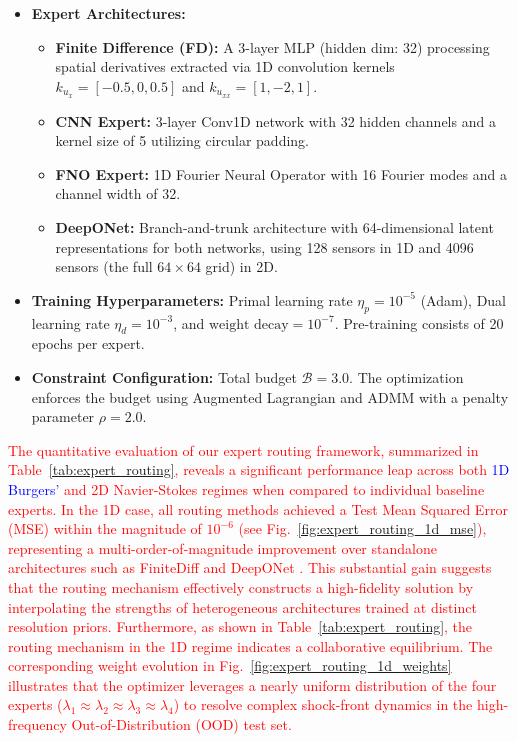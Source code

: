 \documentclass[preprint,12pt,authoryear]{elsarticle}
\begin{document}
\begin{itemize}
    \item \textbf{Expert Architectures:}
    \begin{itemize}
        \item \textbf{Finite Difference (FD):} A 3-layer MLP (hidden dim: 32) processing spatial derivatives extracted via 1D convolution kernels $k_{u_x} = [-0.5, 0, 0.5]$ and $k_{u_{xx}} = [1, -2, 1]$.
        \item \textbf{CNN Expert:} 3-layer Conv1D network with 32 hidden channels and a kernel size of 5 utilizing circular padding.
        \item \textbf{FNO Expert:} 1D Fourier Neural Operator with 16 Fourier modes and a channel width of 32.
        \item \textbf{DeepONet:} Branch-and-trunk architecture with 64-dimensional latent representations for both networks, using 128 sensors in 1D and 4096 sensors (the full $64\times64$ grid) in 2D.
    \end{itemize}
    \item \textbf{Training Hyperparameters:} Primal learning rate $\eta_p = 10^{-5}$ (Adam), Dual learning rate $\eta_d = 10^{-3}$, and $\text{weight decay} = 10^{-7}$. Pre-training consists of 20 epochs per expert.
    \item \textbf{Constraint Configuration:} Total budget $\mathcal{B} = 3.0$. The optimization enforces the budget using Augmented Lagrangian and ADMM with a penalty parameter $\rho = 2.0$.
\end{itemize}


\textcolor{red}{The quantitative evaluation of our expert routing framework, summarized in Table~\ref{tab:expert_routing}, reveals a significant performance leap across both \textcolor{blue}{1D Burgers'} and 2D Navier-Stokes regimes when compared to individual baseline experts. In the 1D case, all routing methods achieved a Test Mean Squared Error (MSE) within the magnitude of $10^{-6}$ (see Fig.~\ref{fig:expert_routing_1d_mse}), representing a multi-order-of-magnitude improvement over standalone architectures such as FiniteDiff and DeepONet . This substantial gain suggests that the routing mechanism effectively constructs a high-fidelity solution by interpolating the strengths of heterogeneous architectures trained at distinct resolution priors. Furthermore, as shown in Table~\ref{tab:expert_routing}, the routing mechanism in the 1D regime indicates a collaborative equilibrium. The corresponding weight evolution in Fig.~\ref{fig:expert_routing_1d_weights} illustrates that the optimizer leverages a nearly uniform distribution of the four experts ($\lambda_1 \approx \lambda_2 \approx \lambda_3 \approx \lambda_4$) to resolve complex shock-front dynamics in the high-frequency Out-of-Distribution (OOD) test set.}
\end{document}
